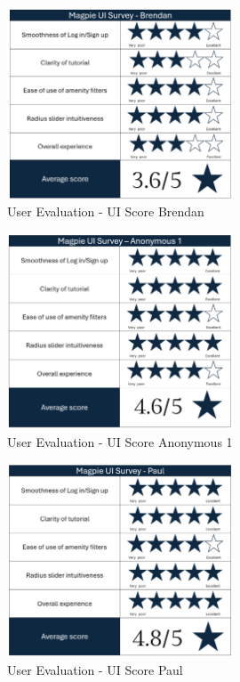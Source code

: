 \begin{figure}[htbp]
    \centering
    \includegraphics[width=0.6\textwidth]{images/survey-brendan.png}
    \caption{User Evaluation - UI Score Brendan}
    \label{fig:brendanscore}
\end{figure}

\begin{figure}[htbp]
    \centering
    \includegraphics[width=0.6\textwidth]{images/survey-maira.png}
    \caption{User Evaluation - UI Score Anonymous 1}
    \label{fig:mairascore}
\end{figure}

\begin{figure}[htbp]
    \centering
    \includegraphics[width=0.6\textwidth]{images/survey-paul.png}
    \caption{User Evaluation - UI Score Paul}
    \label{fig:paulscore}
\end{figure}

